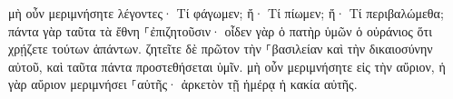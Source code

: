 \documentclass{openreader}
\begin{document}
μὴ οὖν μεριμνήσητε λέγοντες· Τί φάγωμεν; ἤ· Τί πίωμεν; ἤ· Τί περιβαλώμεθα; 
πάντα γὰρ ταῦτα τὰ ἔθνη ⸀ἐπιζητοῦσιν· οἶδεν γὰρ ὁ πατὴρ ὑμῶν ὁ οὐράνιος ὅτι χρῄζετε τούτων ἁπάντων. 
ζητεῖτε δὲ πρῶτον τὴν ⸀βασιλείαν καὶ τὴν δικαιοσύνην αὐτοῦ, καὶ ταῦτα πάντα προστεθήσεται ὑμῖν. 
μὴ οὖν μεριμνήσητε εἰς τὴν αὔριον, ἡ γὰρ αὔριον μεριμνήσει ⸀αὑτῆς· ἀρκετὸν τῇ ἡμέρᾳ ἡ κακία αὐτῆς. 
\end{document}
